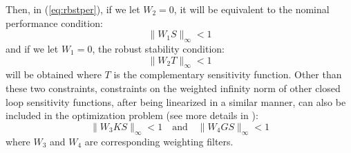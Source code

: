 \documentclass [12pt , a4paper] {report}
\begin{document}
Then, in (\ref{eq:rbstper}), if we let $W_2=0$, it will be equivalent to the nominal performance condition: 
\begin{equation}
\label{eq:nomper}
\|W_1S\|_\infty<1
\end{equation}
and if we let $W_1=0$, the robust stability condition:
\begin{equation}
\label{eq:rbststab}
\|W_2T\|_\infty<1
\end{equation}
 will be obtained where $T$ is the complementary sensitivity function. Other than these two constraints, constraints on the weighted infinity norm of other closed loop sensitivity functions, after being linearized in a similar manner, can also be included in the optimization problem (see more details in \cite{KG10}):
\begin{equation}
\label{eq:W3W4}
\|W_3KS\|_\infty<1 \quad \mbox{and} \quad \|W_4GS\|_\infty<1 
\end{equation}
where $W_3$ and $W_4$ are corresponding weighting filters.
\end{document}
